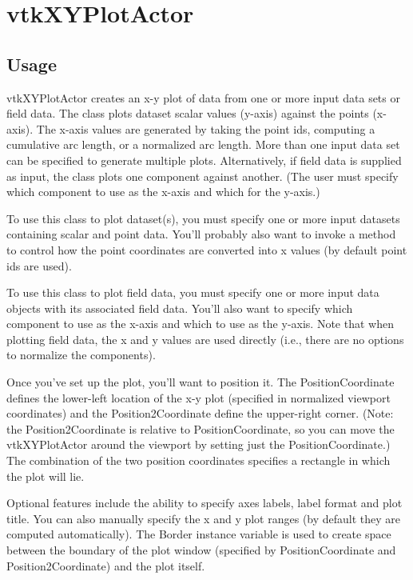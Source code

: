 \section{vtkXYPlotActor}

\subsection{Usage}

 vtkXYPlotActor creates an x-y plot of data from one or more input data
 sets or field data. The class plots dataset scalar values (y-axis) against
 the points (x-axis). The x-axis values are generated by taking the point
 ids, computing a cumulative arc length, or a normalized arc length. More
 than one input data set can be specified to generate multiple plots.
 Alternatively, if field data is supplied as input, the class plots one
 component against another. (The user must specify which component to use
 as the x-axis and which for the y-axis.)

 To use this class to plot dataset(s), you must specify one or more
 input datasets containing scalar and point data.  You'll probably also
 want to invoke a method to control how the point coordinates are converted
 into x values (by default point ids are used).

 To use this class to plot field data, you must specify one or more input
 data objects with its associated field data. You'll also want to specify
 which component to use as the x-axis and which to use as the y-axis.
 Note that when plotting field data, the x and y values are used directly
 (i.e., there are no options to normalize the components).

 Once you've set up the plot, you'll want to position it.  The
 PositionCoordinate defines the lower-left location of the x-y plot
 (specified in normalized viewport coordinates) and the Position2Coordinate
 define the upper-right corner. (Note: the Position2Coordinate is relative
 to PositionCoordinate, so you can move the vtkXYPlotActor around the
 viewport by setting just the PositionCoordinate.) The combination of the
 two position coordinates specifies a rectangle in which the plot will lie.

 Optional features include the ability to specify axes labels, label
 format and plot title. You can also
 manually specify the x and y plot ranges (by default they are computed
 automatically). The Border instance variable is used to create space 
 between the boundary of the plot window (specified by PositionCoordinate
 and Position2Coordinate) and the plot itself.

